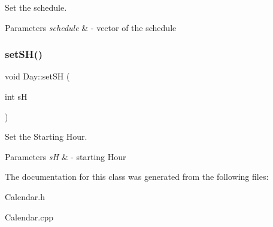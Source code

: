 Set the schedule. 


\begin{DoxyParams}{Parameters}
{\em schedule} & -\/ vector of the schedule \\
\hline
\end{DoxyParams}
\mbox{\label{class_day_a6fc6dfeef1c92b9a5395648c4d0c8a70}} 
\subsubsection{\texorpdfstring{set\+S\+H()}{setSH()}}
{\footnotesize\ttfamily void Day\+::set\+SH (\begin{DoxyParamCaption}\item[{int}]{sH }\end{DoxyParamCaption})}



Set the Starting Hour. 


\begin{DoxyParams}{Parameters}
{\em sH} & -\/ starting Hour \\
\hline
\end{DoxyParams}


The documentation for this class was generated from the following files\+:\begin{DoxyCompactItemize}
\item 
Calendar.\+h\item 
Calendar.\+cpp\end{DoxyCompactItemize}
